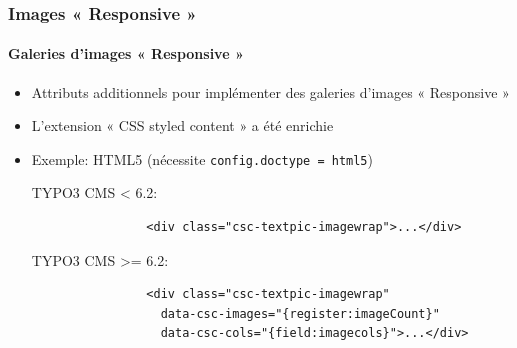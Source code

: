 \begin{frame}[fragile]
	\frametitle{Images « Responsive »}
	\framesubtitle{Galeries d'images « Responsive »}

	\begin{itemize}
		\item Attributs additionnels pour implémenter des galeries d'images « Responsive »
		\item L'extension « CSS styled content » a été enrichie
		\item Exemple: HTML5 (nécessite \texttt{config.doctype = html5})\newline

			TYPO3 CMS < 6.2:


			\begin{lstlisting}
				<div class="csc-textpic-imagewrap">...</div>
			\end{lstlisting}

			TYPO3 CMS >= 6.2:

			\begin{lstlisting}
				<div class="csc-textpic-imagewrap"
				  data-csc-images="{register:imageCount}"
				  data-csc-cols="{field:imagecols}">...</div>
			\end{lstlisting}

	\end{itemize}

\end{frame}


